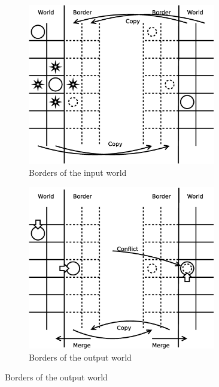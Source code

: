 \documentclass[a4paper]{article}
\begin{document}
\begin{figure}[ht]
    \begin{subfigure}[b]{.5\linewidth}
        \centering
        \includegraphics[width=0.9\textwidth]{border1}
        \caption{Borders of the input world}
        \end{subfigure}%
    \begin{subfigure}[b]{.5\linewidth}
        \centering
        \includegraphics[width=0.9\textwidth]{border2}
        \caption{Borders of the output world}
    \end{subfigure}
\end{figure}
\end{document}
